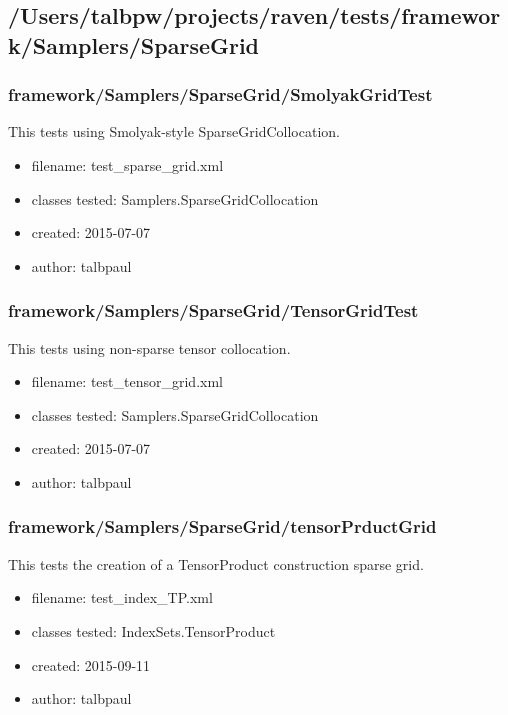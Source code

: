   \subsection{/Users/talbpw/projects/raven/tests/framework/Samplers/SparseGrid}
    \subsubsection{framework/Samplers/SparseGrid/SmolyakGridTest}
      
      This tests using Smolyak-style SparseGridCollocation.
    
      \begin{itemize}
          \item filename: test\_sparse\_grid.xml
          \item classes tested: Samplers.SparseGridCollocation
          \item created: 2015-07-07
          \item author: talbpaul
      \end{itemize}
    \subsubsection{framework/Samplers/SparseGrid/TensorGridTest}
      
      This tests using non-sparse tensor collocation.
    
      \begin{itemize}
          \item filename: test\_tensor\_grid.xml
          \item classes tested: Samplers.SparseGridCollocation
          \item created: 2015-07-07
          \item author: talbpaul
      \end{itemize}
    \subsubsection{framework/Samplers/SparseGrid/tensorPrductGrid}
      
      This tests the creation of a TensorProduct construction sparse grid.
    
      \begin{itemize}
          \item filename: test\_index\_TP.xml
          \item classes tested: IndexSets.TensorProduct
          \item created: 2015-09-11
          \item author: talbpaul
      \end{itemize}
